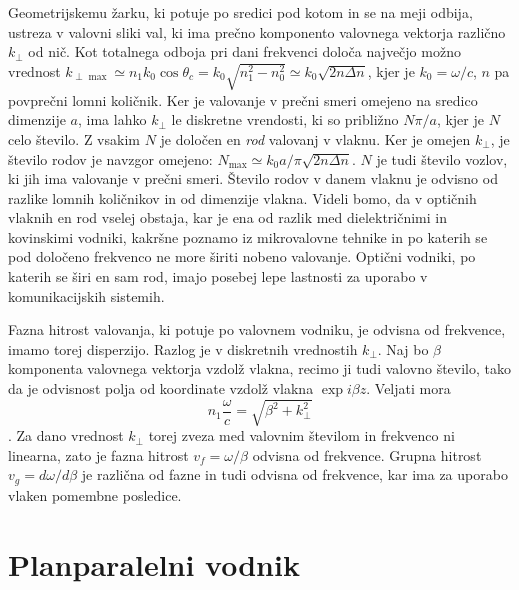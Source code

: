\documentclass[11pt,fleqn]{book} %
\begin{document}
Geometrijskemu žarku, ki potuje po sredici pod kotom in se na meji
odbija, ustreza v valovni sliki val, ki ima prečno komponento valovnega
vektorja različno $k_{\perp}$ od nič. Kot totalnega odboja pri dani
frekvenci določa največjo možno vrednost $k_{\perp\max}\simeq n_{1}k_{0}\cos\theta_{c}=k_{0}\sqrt{n_{1}^{2}-n_{0}^{2}}\simeq k_{0}\sqrt{2n\Delta n}$,
kjer je $k_{0}=\omega/c$, $n$ pa povprečni lomni količnik. Ker je
valovanje v prečni smeri omejeno na sredico dimenzije $a$, ima lahko
$k_{\perp}$ le diskretne vrendosti, ki so približno $N\pi/a$, kjer
je $N$ celo število. Z vsakim $N$ je določen en \textit{rod }valovanj
v vlaknu. Ker je omejen $k_{\perp}$, je število rodov je navzgor
omejeno: $N_{\max}\simeq k_{0}a/\pi\sqrt{2n\Delta n}.$ $N$ je tudi
število vozlov, ki jih ima valovanje v prečni smeri. Število rodov
v danem vlaknu je odvisno od razlike lomnih količnikov in od dimenzije
vlakna. Videli bomo, da v optičnih vlaknih en rod vselej obstaja,
kar je ena od razlik med dielektričnimi in kovinskimi vodniki, kakršne
poznamo iz mikrovalovne tehnike in po katerih se pod določeno frekvenco
ne more širiti nobeno valovanje. Optični vodniki, po katerih se širi
en sam rod, imajo posebej lepe lastnosti za uporabo v komunikacijskih
sistemih.

Fazna hitrost valovanja, ki potuje po valovnem vodniku, je odvisna
od frekvence, imamo torej disperzijo. Razlog je v diskretnih vrednostih
$k_{\perp}$. Naj bo $\beta$ komponenta valovnega vektorja vzdolž
vlakna, recimo ji tudi valovno število, tako da je odvisnost polja
od koordinate vzdolž vlakna $\exp i\beta z$. Veljati mora 
\begin{equation}
n_{1}\frac{\omega}{c}=\sqrt{\beta^{2}+k_{\perp}^{2}}\label{9.0}
\end{equation}
 $.$ Za dano vrednost $k_{\perp}$ torej zveza med valovnim številom
in frekvenco ni linearna, zato je fazna hitrost $v_{f}=\omega/\beta$
odvisna od frekvence. Grupna hitrost $v_{g}=d\omega/d\beta$ je različna
od fazne in tudi odvisna od frekvence, kar ima za uporabo vlaken pomembne
posledice.


\section{Planparalelni vodnik}
\end{document}
